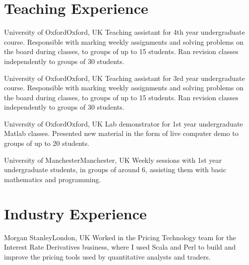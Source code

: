 \documentclass[11pt,a4paper,roman]{moderncv} %
\begin{document}
\section{Teaching Experience}


        {University of Oxford}{Oxford, UK}{}
        {
          Teaching assistant for 4th year undergraduate course.
          Responsible with marking weekly assignments and solving
          problems on the board during classes, to groups
          of up to 15 students.
          Ran revision classes independently to groups of 30 students.
        }

        {University of Oxford}{Oxford, UK}{}
        {
          Teaching assistant for 3rd year undergraduate course.
          Responsible with marking weekly assignments and solving
          problems on the board during classes, to groups
          of up to 15 students.
          Ran revision classes independently to groups of 30 students.
        }

        {University of Oxford}{Oxford, UK}{}
        {
          Lab demonstrator for 1st year undergraduate Matlab classes.
          Presented new material in the form of live computer demo to groups
          of up to 20 students.
        }

        {University of Manchester}{Manchester, UK}{}
        {
          Weekly sessions with 1st year 
          undergraduate students, in groups of around 6,
          assisting them with basic mathematics and programming.
        }


\section{Industry Experience}

        {Morgan Stanley}{London, UK}{}
        {
          Worked in the Pricing Technology team for the Interest 
          Rate Derivatives business, where I used Scala and Perl 
          to build and improve the pricing tools used 
          by quantitative analysts and traders. 
        }
\end{document}
